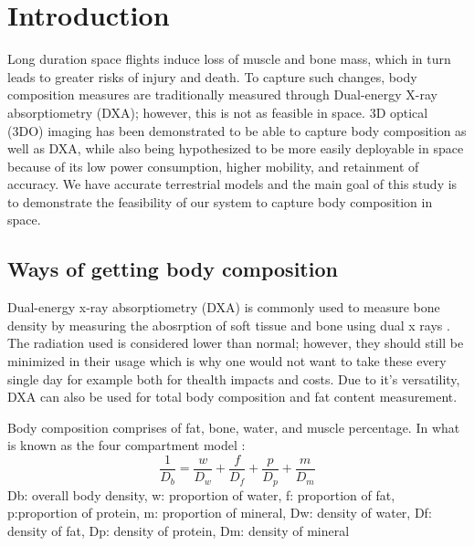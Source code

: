 

\chapter{Introduction}

Long duration space flights induce loss of muscle and bone mass, which in turn leads to greater risks of injury and death. To capture such changes, body composition measures are traditionally measured through Dual-energy X-ray absorptiometry (DXA); however, this is not as feasible in space. 3D optical (3DO) imaging has been demonstrated to be able to capture body composition as well as DXA, while also being hypothesized to be more easily deployable in space because of its low power consumption, higher mobility, and retainment of accuracy. We have accurate terrestrial models and the main goal of this study is to demonstrate the feasibility of our system to capture body composition in space. 
\section{Ways of getting body composition}
Dual-energy x-ray absorptiometry (DXA) is commonly used to measure bone density by measuring the abosrption of soft tissue and bone using dual x rays \cite{albanese2003clinical}. The radiation used is considered lower than normal; however, they should still be minimized in their usage which is why one would not want to take these every single day for example both for thealth impacts and costs. Due to it's versatility, DXA can also be used for total body composition and fat content measurement.

Body composition comprises of fat, bone, water, and muscle percentage. In what is known as the four compartment model \cite{fuller1992four}:
\begin{equation}
	\frac{1}{D_b} = \frac{w}{D_w} + \frac{f}{D_f} + \frac{p}{D_p} + \frac{m}{D_m}
\end{equation}
Db: overall body density, w: proportion of water, f: proportion of fat, p:proportion of protein, m: proportion of mineral, Dw: density of water, Df: density of fat, Dp: density of protein, Dm: density of mineral

